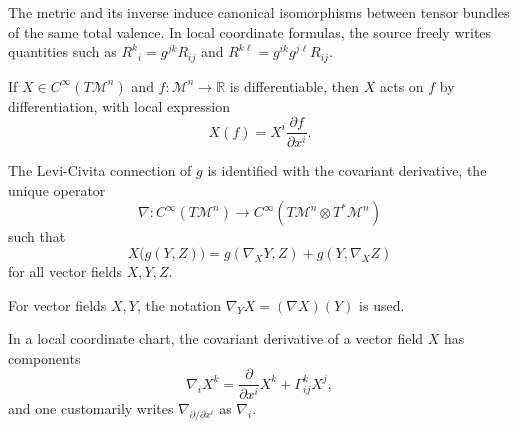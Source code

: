 \begin{remark}
\label{appa-rem-index-raising-lowering}

The metric and its inverse induce canonical isomorphisms between tensor bundles of the same total valence. In local coordinate formulas, the source freely writes quantities such as \(R^k{}_i=g^{jk}R_{ij}\) and \(R^{k\ell}=g^{ik}g^{j\ell}R_{ij}\).
\end{remark}

\begin{definition}
\label{appa-def-vector-action-on-function}

If \(X\in C^\infty(T\mathcal M^n)\) and \(f:\mathcal M^n\to \mathbb R\) is differentiable, then \(X\) acts on \(f\) by differentiation, with local expression
\[
X(f)=X^i\frac{\partial f}{\partial x^i}.
\]
\end{definition}

\begin{definition}
\label{appa-def-levi-civita-covariant-derivative}


The Levi-Civita connection of \(g\) is identified with the covariant derivative, the unique operator
\[
\nabla : C^\infty(T\mathcal M^n)\to C^\infty(T\mathcal M^n\otimes T^*\mathcal M^n)
\]
such that
\[
X\bigl(g(Y,Z)\bigr)=g(\nabla_XY,Z)+g(Y,\nabla_XZ)
\]
for all vector fields \(X,Y,Z\).
\end{definition}

\begin{remark}
\label{appa-rem-covariant-derivative-vector}

For vector fields \(X,Y\), the notation \(\nabla_YX=(\nabla X)(Y)\) is used.
\end{remark}

\begin{definition}
\label{appa-def-covariant-derivative-vector}



In a local coordinate chart, the covariant derivative of a vector field \(X\) has components
\[
\nabla_i X^k = \frac{\partial}{\partial x^i}X^k + \Gamma^k_{ij}X^j,
\]
and one customarily writes \(\nabla_{\partial/\partial x^i}\) as \(\nabla_i\).
\end{definition}

